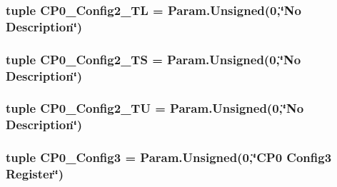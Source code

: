 \label{classMipsCPU_1_1BaseMipsCPU_aa29587ae710f53b37f05bf85275b1f83}
\hypertarget{classMipsCPU_1_1BaseMipsCPU_aff1da39b3e8559fbe0df5ed951bfbea8}{
\subsubsection[{CP0\_\-Config2\_\-TL}]{\setlength{\rightskip}{0pt plus 5cm}tuple {\bf CP0\_\-Config2\_\-TL} = Param.Unsigned(0,\char`\"{}No Description\char`\"{})}}
\label{classMipsCPU_1_1BaseMipsCPU_aff1da39b3e8559fbe0df5ed951bfbea8}
\hypertarget{classMipsCPU_1_1BaseMipsCPU_ab8c0e1f83f50f78f543fe1adf31af3d8}{
\subsubsection[{CP0\_\-Config2\_\-TS}]{\setlength{\rightskip}{0pt plus 5cm}tuple {\bf CP0\_\-Config2\_\-TS} = Param.Unsigned(0,\char`\"{}No Description\char`\"{})}}
\label{classMipsCPU_1_1BaseMipsCPU_ab8c0e1f83f50f78f543fe1adf31af3d8}
\hypertarget{classMipsCPU_1_1BaseMipsCPU_ab3e9ceb3ef7cffcd31cee879d050dbeb}{
\subsubsection[{CP0\_\-Config2\_\-TU}]{\setlength{\rightskip}{0pt plus 5cm}tuple {\bf CP0\_\-Config2\_\-TU} = Param.Unsigned(0,\char`\"{}No Description\char`\"{})}}
\label{classMipsCPU_1_1BaseMipsCPU_ab3e9ceb3ef7cffcd31cee879d050dbeb}
\hypertarget{classMipsCPU_1_1BaseMipsCPU_ac0b6416224f47ab3b4d1e049034e1ecc}{
\subsubsection[{CP0\_\-Config3}]{\setlength{\rightskip}{0pt plus 5cm}tuple {\bf CP0\_\-Config3} = Param.Unsigned(0,\char`\"{}CP0 Config3 {\bf Register}\char`\"{})}}
